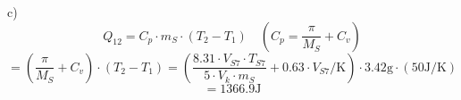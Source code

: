 c)
\[
Q_{12} = C_p \cdot m_S \cdot (T_2 - T_1) \quad \left( C_p = \frac{\pi}{M_S} + C_v \right)
\]
\[
= \left( \frac{\pi}{M_S} + C_v \right) \cdot (T_2 - T_1) = \left( \frac{8.31 \cdot V_{S7} \cdot T_{S7}}{5 \cdot V_k \cdot m_S} + 0.63 \cdot V_{S7} / \text{K} \right) \cdot 3.42 \text{g} \cdot (50 \text{J} / \text{K})
\]
\[
= 1366.9 \text{J}
\]